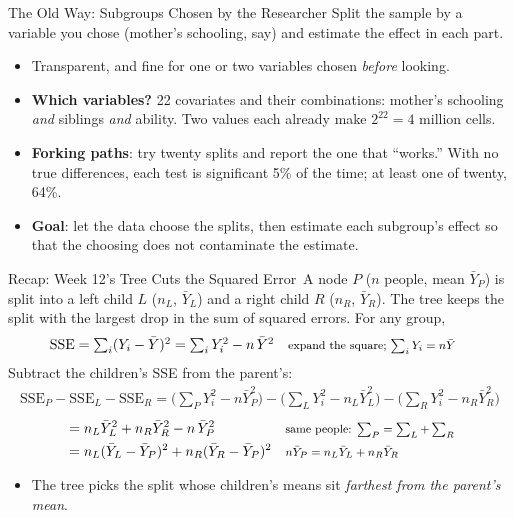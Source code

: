 \documentclass[aspectratio=169,11pt,xcolor=dvipsnames]{beamer}
\newcommand{\core}{\,\raisebox{0.6pt}{\textcolor{corestar}{$\bigstar$}}}
\begin{document}
\begin{frame}{The Old Way: Subgroups Chosen by the Researcher}
Split the sample by a variable you chose (mother's schooling, say) and estimate the
effect in each part.
\vskip4pt
\begin{itemize}\itemsep5pt
  \item Transparent, and fine for one or two variables chosen \emph{before} looking.
  \item \textbf{Which variables?} 22 covariates and their combinations: mother's schooling
        \emph{and} siblings \emph{and} ability. Two values each already make $2^{22} = 4$
        million cells.
  \item \textbf{Forking paths}: try twenty splits and report the one that ``works.'' With no
        true differences, each test is significant 5\% of the time; at least one of twenty, 64\%.
  \item \textbf{Goal}: let the data choose the splits, then estimate each subgroup's effect
        so that the choosing does not contaminate the estimate.
\end{itemize}
\end{frame}

\begin{frame}{Recap: Week 12's Tree Cuts the Squared Error\core}
A node $P$ ($n$ people, mean $\bar Y_P$) is split into a left child $L$ ($n_L$, $\bar Y_L$) and a right child $R$ ($n_R$, $\bar Y_R$).
The tree keeps the split with the largest drop in the sum of squared errors. For any group,
\begin{align*}
  \text{SSE} = \textstyle\sum_i (Y_i - \bar Y)^2 &= \textstyle\sum_i Y_i^2 - n\,\bar Y^2
   && \text{\footnotesize expand the square; $\textstyle\sum_i Y_i = n\bar Y$}
\end{align*}
Subtract the children's SSE from the parent's:
\begin{align*}
  \text{SSE}_P - \text{SSE}_L - \text{SSE}_R
  = \big(\textstyle\sum_{P} Y_i^2 - n\bar Y_P^2\big) - \big(\textstyle\sum_{L} Y_i^2 - n_L\bar Y_L^2\big)
     - \big(\textstyle\sum_{R} Y_i^2 - n_R\bar Y_R^2\big)
\end{align*}
\vskip-14pt
\begin{align*}
  &= n_L\bar Y_L^2 + n_R\bar Y_R^2 - n\,\bar Y_P^2
   && \text{\footnotesize same people: $\textstyle\sum_P = \sum_L + \sum_R$} \\
  &= n_L(\bar Y_L - \bar Y_P)^2 + n_R(\bar Y_R - \bar Y_P)^2
   && \text{\footnotesize $n\bar Y_P = n_L\bar Y_L + n_R\bar Y_R$}
\end{align*}
\vskip-4pt
\begin{itemize}\itemsep3pt
  \item The tree picks the split whose children's means sit \emph{farthest from the parent's mean}.
\end{itemize}
\end{frame}
\end{document}
